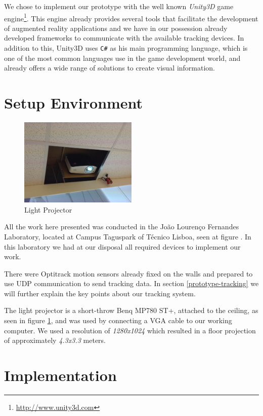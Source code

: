 We chose to implement our prototype with the well known \emph{Unity3D} game engine\footnote{\url{http://www.unity3d.com}}.
This engine already provides several tools that facilitate the development of augmented reality applications and we have in our possession already developed frameworks to communicate with the available tracking devices. In addition to this, Unity3D uses \texttt{C\#} as his main programming language, which is one of the most common languages use in the game development world, and already offers a wide range of solutions to create visual information.

\section{Setup Environment}

\begin{figure}[!t]
\centering
\includegraphics[width=0.5\textwidth]{imgs/impl/projector.png}
\caption{Light Projector}
\label{fig:projector}
\end{figure}

All the work here presented was conducted in the Jo\~ao Louren\c{c}o Fernandes Laboratory, located at Campus Taguspark of T\'ecnico Lisboa, seen at figure .
In this laboratory we had at our disposal all required devices to implement our work.

There were Optitrack motion sensors already fixed on the walls and prepared to use UDP communication to send tracking data. 
In section \ref{prototype-tracking} we will further explain the key points about our tracking system.

The light projector is a short-throw Benq MP780 ST+, attached to the ceiling, as seen in figure \ref{fig:projector}, and
was used by connecting a VGA cable to our working computer. We used a resolution of \textit{1280x1024} which resulted in a floor projection of approximately \textit{4.3x3.3} 
meters.

\section{Implementation}

